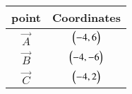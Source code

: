 \begin{tabular}{ |c| c|}
    \hline
    \textbf{point}  &  \textbf{Coordinates}\\
    \hline
    $\vec{A}$ & $\begin{pmatrix}-4,6\end{pmatrix}$ \\
    \hline
    $\vec{B}$ & $\begin{pmatrix}-4,-6\end{pmatrix}$\\
    \hline
    $\vec{C}$ & $\begin{pmatrix}-4,2\end{pmatrix}$\\
    \hline
\end{tabular}    

